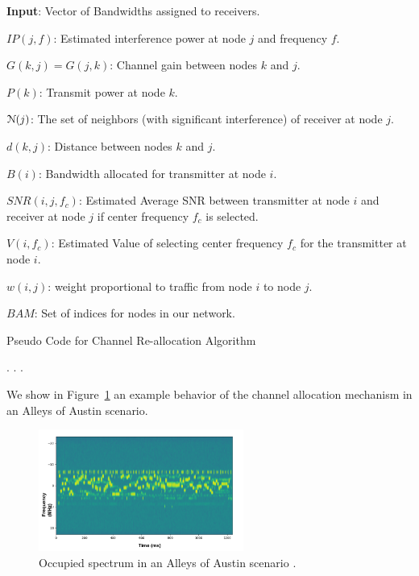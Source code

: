 \documentclass[11pt]{article}
\begin{document}
\begin{algorithm}
{\bf Input}: Vector of Bandwidths assigned to receivers.

$IP(j,f)$: Estimated interference power at node $j$ and frequency $f$.

$G(k,j)=G(j,k)$: Channel gain between nodes $k$ and $j$.

$P(k)$: Transmit power at node $k$.

${\cal N}(j)$: The set of neighbors (with significant interference) of receiver at node $j$.

$d(k,j)$: Distance between nodes $k$ and $j$.

$B(i)$: Bandwidth allocated for transmitter at node $i$.

$SNR(i,j,f_c)$: Estimated Average SNR between transmitter at node $i$ and receiver at node $j$ if center frequency $f_c$ is selected.

$V(i,f_c)$: Estimated Value of selecting center frequency $f_c$ for the transmitter at node $i$.

$w(i,j)$: weight proportional to traffic from node $i$ to node $j$.

$BAM$: Set of indices for nodes in our network.
\begin{algorithmic}[1]
\caption{Pseudo Code for Channel Re-allocation Algorithm}
.
.
.

\end{algorithmic}
\label{alg:realloc}
\end{algorithm}
We show in Figure~\ref{fig:channelalloc} an example behavior of the channel allocation mechanism in an Alleys of Austin scenario.

\begin{figure} [htb]
     \centerline{
     \includegraphics[width = 0.6\textwidth]{Figures/ChanAllocEx.png}}
     \caption{Occupied spectrum in an Alleys of Austin scenario \cite[Figure $9$]{func-report}.}
     \label{fig:channelalloc}
     \end{figure}
     
\end{document}
